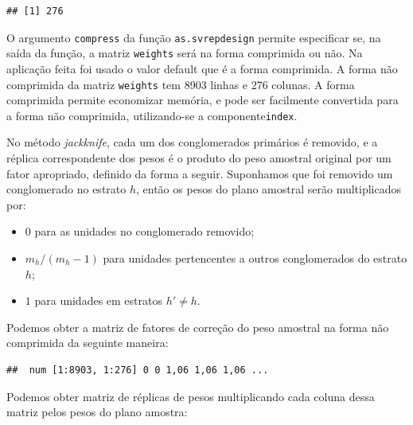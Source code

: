 \documentclass[]{book}
\newenvironment{Shaded}{\begin{snugshade}}{\end{snugshade}}
\newcommand{\KeywordTok}[1]{\textcolor[rgb]{0.13,0.29,0.53}{\textbf{#1}}}
\newcommand{\DecValTok}[1]{\textcolor[rgb]{0.00,0.00,0.81}{#1}}
\newcommand{\StringTok}[1]{\textcolor[rgb]{0.31,0.60,0.02}{#1}}
\newcommand{\OperatorTok}[1]{\textcolor[rgb]{0.81,0.36,0.00}{\textbf{#1}}}
\newcommand{\NormalTok}[1]{#1}
\providecommand{\tightlist}{%
  \setlength{\itemsep}{0pt}\setlength{\parskip}{0pt}}
\theoremstyle{definition}
\theoremstyle{definition}
\theoremstyle{definition}
\theoremstyle{remark}
\begin{document}
\begin{verbatim}
## [1] 276
\end{verbatim}

O argumento \texttt{compress} da função \texttt{as.svrepdesign} permite
especificar se, na saída da função, a matriz \texttt{weights} será na
forma comprimida ou não. Na aplicação feita foi usado o valor default
que é a forma comprimida. A forma não comprimida da matriz
\texttt{weights} tem 8903 linhas e 276 colunas. A forma comprimida
permite economizar memória, e pode ser facilmente convertida para a
forma não comprimida, utilizando-se a componente\texttt{index}.

No método \emph{jackknife}, cada um dos conglomerados primários é
removido, e a réplica correspondente dos pesos é o produto do peso
amostral original por um fator apropriado, definido da forma a seguir.
Suponhamos que foi removido um conglomerado no estrato \(h\), então os
pesos do plano amostral serão multiplicados por:

\begin{itemize}
\tightlist
\item
  \(0\) para as unidades no conglomerado removido;
\item
  \(m_h/(m_h-1)\) para unidades pertencentes a outros conglomerados do
  estrato \(h\);
\item
  \(1\) para unidades em estratos \(h'\neq h\).
\end{itemize}

Podemos obter a matriz de fatores de correção do peso amostral na forma
não comprimida da seguinte maneira:

\begin{Shaded}
\end{Shaded}

\begin{verbatim}
##  num [1:8903, 1:276] 0 0 1,06 1,06 1,06 ...
\end{verbatim}

Podemos obter matriz de réplicas de pesos multiplicando cada coluna
dessa matriz pelos pesos do plano amostra:
\end{document}

